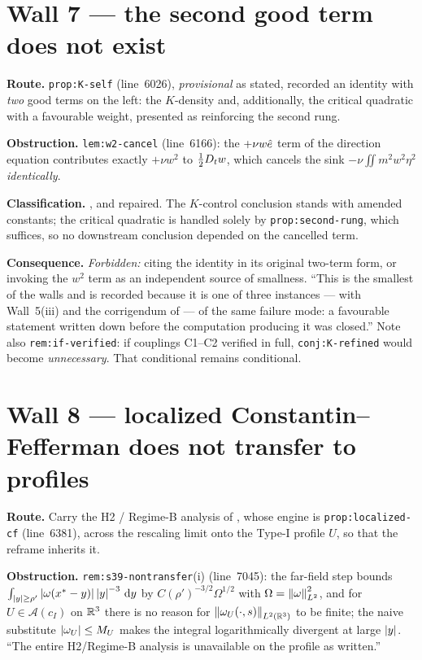 \section{Wall 7 --- the \texorpdfstring{}{S35} second good term does not exist}
\label{sec:wall7}

\textbf{Route.} \texttt{prop:K-self} (line~6026), \emph{provisional} as stated,
recorded an identity with \emph{two} good terms on the left: the \(K\)-density
and, additionally, the critical quadratic with a favourable weight, presented
as reinforcing the second rung.

\textbf{Obstruction.} \texttt{lem:w2-cancel} (line~6166): the \(+\nu w\hat{e}\)
term of the direction equation contributes exactly \(+\nu w^2\) to
\(\tfrac12D_t w\), which cancels the sink \(-\nu\iint m^2w^2\eta^2\)
\emph{identically}.

\textbf{Classification.} \WITHDRAWN{}, and repaired. The \(K\)-control
conclusion stands with amended constants; the critical quadratic is handled
solely by \texttt{prop:second-rung}, which suffices, so no downstream
conclusion depended on the cancelled term.

\textbf{Consequence.} \emph{Forbidden:} citing the identity in its original
two-term form, or invoking the \(w^2\) term as an independent source of
smallness. ``This is the smallest of the walls and is recorded because it is
one of three instances --- with Wall~5(iii) and the corrigendum of  ---
of the same failure mode: a favourable statement written down before the
computation producing it was closed.'' Note also
\texttt{rem:if-verified}: if couplings C1--C2 verified in full,
\texttt{conj:K-refined} would become \emph{unnecessary}. That conditional
remains conditional.

\section{Wall 8 --- localized Constantin--Fefferman does not transfer to profiles}
\label{sec:wall8}

\textbf{Route.} Carry the H2 / Regime-B analysis of , whose engine is
\texttt{prop:localized-cf} (line~6381), across the rescaling limit onto the
Type-I profile \(U\), so that the  reframe inherits it.

\textbf{Obstruction.} \texttt{rem:s39-nontransfer}(i) (line~7045): the
far-field step bounds
\(\int_{\left|y\right|\ge\rho'}\left|\omega(x^*-y)\right|\left|y\right|^{-3}\,\mathrm{d} y\) by
\(C(\rho')^{-3/2}\Omega^{1/2}\) with \(\Omega=\left\|\omega\right\|_{L^2}^2\), and for
\(U\in\mathcal{A}(c_I)\) on \(\mathbb{R}^3\) there is no reason for
\(\left\|\omega_U(\cdot,s)\right\|_{L^2(\mathbb{R}^3)}\) to be finite; the naive substitute
\(\left|\omega_U\right|\le M_U\) makes the integral logarithmically divergent at large
\(\left|y\right|\). ``The entire H2/Regime-B analysis is unavailable on the profile as
written.''


